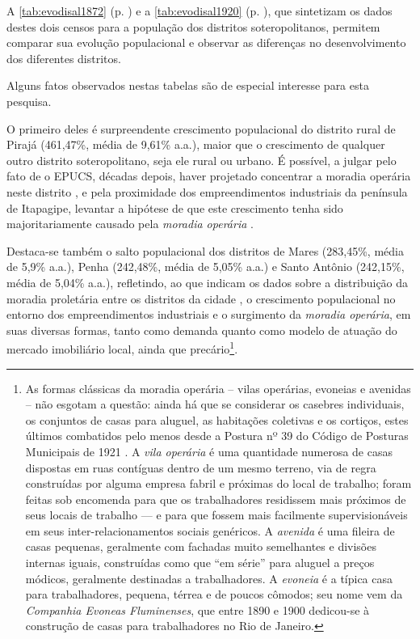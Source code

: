A \autoref{tab:evodisal1872} (p. \pageref{tab:evodisal1872}) e a \autoref{tab:evodisal1920} (p. \pageref{tab:evodisal1920}), que sintetizam os dados destes dois censos para a população dos distritos soteropolitanos, permitem comparar sua evolução populacional e observar as diferenças no desenvolvimento dos diferentes distritos. 




Alguns fatos observados nestas tabelas são de especial interesse para esta pesquisa.

O primeiro deles é surpreendente crescimento populacional do distrito rural de Pirajá (461,47\%, média de 9,61\% a.a.), maior que o crescimento de qualquer outro distrito soteropolitano, seja ele rural ou urbano. É possível, a julgar pelo fato de o EPUCS, décadas depois, haver projetado concentrar a moradia operária neste distrito \cite{PREFEITURA1978,sampaio_formas_1999}, e pela proximidade dos empreendimentos industriais da península de Itapagipe, levantar a hipótese de que este crescimento tenha sido majoritariamente causado pela \textit{moradia operária} \cite{cardoso_vilas_1991}.

Destaca-se também o salto populacional dos distritos de Mares (283,45\%, média de 5,9\% a.a.), Penha (242,48\%, média de 5,05\% a.a.) e Santo Antônio (242,15\%, média de 5,04\% a.a.), refletindo, ao que indicam os dados sobre a distribuição da moradia proletária entre os distritos da cidade \cite[p.~126]{cardoso_vilas_1991}, o crescimento populacional no entorno dos empreendimentos industriais e o surgimento da \textit{moradia operária}, em suas diversas formas, tanto como demanda quanto como modelo de atuação do mercado imobiliário local, ainda que precário\footnote{As formas clássicas da moradia operária -- vilas operárias, evoneias e avenidas -- não esgotam a questão: ainda há que se considerar os casebres individuais, os conjuntos de casas para aluguel, as habitações coletivas e os cortiços, estes últimos combatidos pelo menos desde a Postura nº 39 do Código de Posturas Municipais de 1921 \cite{PREFEITURA1921}. A \textit{vila operária} é uma quantidade numerosa de casas dispostas em ruas contíguas dentro de um mesmo terreno, via de regra construídas por alguma empresa fabril e próximas do local de trabalho; foram feitas sob encomenda para que os trabalhadores residissem mais próximos de seus locais de trabalho --- e para que fossem mais facilmente supervisionáveis em seus inter-relacionamentos sociais genéricos. A \textit{avenida} é uma fileira de casas pequenas, geralmente com fachadas muito semelhantes e divisões internas iguais, construídas como que ``em série'' para aluguel a preços módicos, geralmente destinadas a trabalhadores. A \textit{evoneia} é a típica casa para trabalhadores, pequena, térrea e de poucos cômodos; seu nome vem da \textit{Companhia Evoneas Fluminenses}, que entre 1890 e 1900 dedicou-se à construção de casas para trabalhadores no Rio de Janeiro. }.

